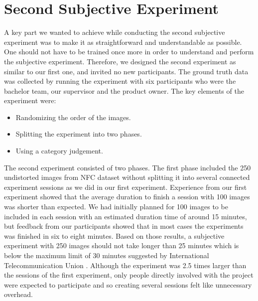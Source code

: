 \section{Second Subjective Experiment}
\label{sec:secondse}
A key part we wanted to achieve while conducting the second subjective experiment was to make it as straightforward and understandable as possible. One should not have to be trained once more in order to understand and perform the subjective experiment. Therefore, we designed the second experiment as similar to our first one, and invited no new participants. The ground truth data was collected by running the experiment with six participants who were the bachelor team, our supervisor and the product owner. The key elements of the experiment were: 
\begin{itemize}
    \item Randomizing the order of the images.
    \item Splitting the experiment into two phases. 
    \item Using a category judgement.
\end{itemize}

The second experiment consisted of two phases. The first phase included the 250 undistorted images from NFC dataset without splitting it into several connected experiment sessions as we did in our first experiment. Experience from our first experiment showed that the average duration to finish a session with 100 images was shorter than expected. We had initially planned for 100 images to be included in each session with an estimated duration time of around 15 minutes, but feedback from our participants showed that in most cases the experiments was finished in six to eight minutes. Based on those results, a subjective experiment with 250 images should not take longer than 25 minutes which is below the maximum limit of 30 minutes suggested by International Telecommunication Union \cite{methodologySubjective}. Although the experiment was 2.5 times larger than the sessions of the first experiment, only people directly involved with the project were expected to participate and so creating several sessions felt like unnecessary overhead. 

